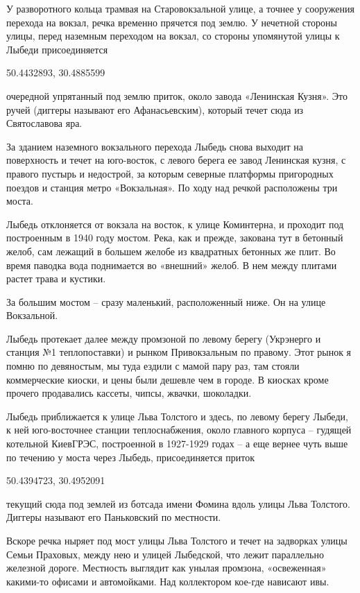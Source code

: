 У разворотного кольца трамвая на Старовокзальной улице, а точнее у сооружения перехода на вокзал, речка временно прячется под землю. У нечетной стороны улицы, перед наземным переходом на вокзал, со стороны упомянутой улицы к Лыбеди присоединяется

50.4432893, 30.4885599

очередной упрятанный под землю приток, около завода «Ленинская Кузня». Это ручей (диггеры называют его Афанасьевским), который течет сюда из Святославова яра.

За зданием наземного вокзального перехода Лыбедь снова выходит на поверхность и течет на юго-восток, с левого берега ее завод Ленинская кузня, с правого пустырь и недострой, за которым северные платформы пригородных поездов и станция метро «Вокзальная». По ходу над речкой расположены три моста.

Лыбедь отклоняется от вокзала на восток, к улице Коминтерна, и проходит под построенным в 1940 году мостом. Река, как и прежде, закована тут в бетонный желоб, сам лежащий в большем желобе из квадратных бетонных же плит. Во время паводка вода поднимается во «внешний» желоб. В нем между плитами растет трава и кустики.

За большим мостом – сразу маленький, расположенный ниже. Он на улице Вокзальной.

Лыбедь протекает далее между промзоной по левому берегу (Укрэнерго и станция №1 теплопоставки) и рынком Привокзальным по правому. Этот рынок я помню по девяностым, мы туда ездили с мамой пару раз, там стояли коммерческие киоски, и цены были дешевле чем в городе. В киосках кроме прочего продавались кассеты, чипсы, жвачки, шоколадки. 

Лыбедь приближается к улице Льва Толстого и здесь, по левому берегу Лыбеди, к ней юго-восточнее станции теплоснабжения, около главного корпуса – гудящей котельной КиевГРЭС, построенной в 1927-1929 годах – а еще вернее чуть выше по течению у моста через Лыбедь, присоединяется приток

50.4394723, 30.4952091

текущий сюда под землей из ботсада имени Фомина вдоль улицы Льва Толстого. Диггеры называют его Паньковский по местности.

Вскоре речка ныряет под мост улицы Льва Толстого и течет на задворках улицы Семьи Праховых, между нею и улицей Лыбедской, что лежит параллельно железной дороге. Местность выглядит как унылая промзона, «освеженная» какими-то офисами и автомойками. Над коллектором кое-где нависают ивы.

